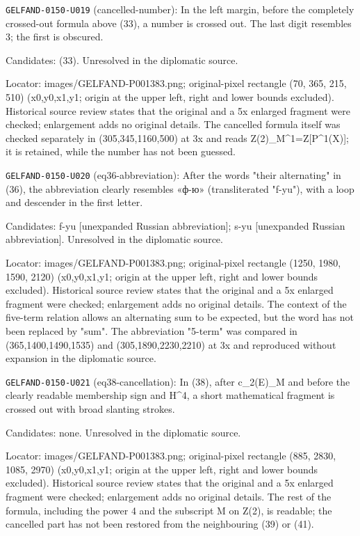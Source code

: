 \noindent\texttt{GELFAND-0150-U019} (cancelled-number): In the left margin, before the completely crossed-out formula above (33), a number is crossed out. The last digit resembles 3; the first is obscured.\par
Candidates: (33). Unresolved in the diplomatic source.\par
Locator: images/GELFAND-P001383.png; original-pixel rectangle (70, 365, 215, 510) (x0,y0,x1,y1; origin at the upper left, right and lower bounds excluded). Historical source review states that the original and a 5x enlarged fragment were checked; enlargement adds no original details. The cancelled formula itself was checked separately in (305,345,1160,500) at 3x and reads Z(2)\_M\textasciicircum{}1=Z[P\textasciicircum{}1(X)]; it is retained, while the number has not been guessed.\par

\noindent\texttt{GELFAND-0150-U020} (eq36-abbreviation): After the words "their alternating" in (36), the abbreviation clearly resembles «ф-ю» (transliterated "f-yu"), with a loop and descender in the first letter.\par
Candidates: f-yu [unexpanded Russian abbreviation]; s-yu [unexpanded Russian abbreviation]. Unresolved in the diplomatic source.\par
Locator: images/GELFAND-P001383.png; original-pixel rectangle (1250, 1980, 1590, 2120) (x0,y0,x1,y1; origin at the upper left, right and lower bounds excluded). Historical source review states that the original and a 5x enlarged fragment were checked; enlargement adds no original details. The context of the five-term relation allows an alternating sum to be expected, but the word has not been replaced by "sum". The abbreviation "5-term" was compared in (365,1400,1490,1535) and (305,1890,2230,2210) at 3x and reproduced without expansion in the diplomatic source.\par

\noindent\texttt{GELFAND-0150-U021} (eq38-cancellation): In (38), after c\_2(E)\_M and before the clearly readable membership sign and H\textasciicircum{}4, a short mathematical fragment is crossed out with broad slanting strokes.\par
Candidates: none. Unresolved in the diplomatic source.\par
Locator: images/GELFAND-P001383.png; original-pixel rectangle (885, 2830, 1085, 2970) (x0,y0,x1,y1; origin at the upper left, right and lower bounds excluded). Historical source review states that the original and a 5x enlarged fragment were checked; enlargement adds no original details. The rest of the formula, including the power 4 and the subscript M on Z(2), is readable; the cancelled part has not been restored from the neighbouring (39) or (41).\par

